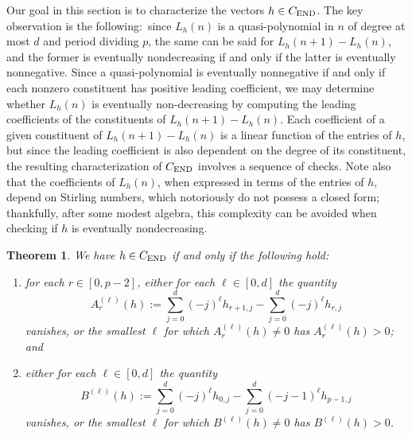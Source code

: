 \documentclass[12pt]{amsart}
\newtheorem{thm}{Theorem}[section]
\theoremstyle{definition}
\numberwithin{equation}{section}
\renewcommand\>{\rangle}
\newcommand\<{\langle}
\newcommand\0{\mathbf{0}}
\begin{document}
Our goal in this section is to characterize the vectors $h \in C_\textnormal{END}$.
The key observation is the following:\ since $L_h(n)$ is a quasi-polynomial in $n$ of degree at most $d$ and period dividing $p$, the same can be said for $L_h(n+1) - L_h(n)$, and the former is eventually nondecreasing if and only if the latter is eventually nonnegative.  Since a quasi-polynomial is eventually nonnegative if and only if each nonzero constituent has positive leading coefficient, we may determine whether $L_h(n)$ is eventually non-decreasing by computing the leading coefficients of the constituents of $L_h(n+1) - L_h(n)$.  Each coefficient of a given constituent of $L_h(n+1) - L_h(n)$ is a linear function of the entries of $h$, but since the leading coefficient is also dependent on the degree of its constituent, the resulting characterization of $C_\textnormal{END}$ involves a sequence of checks.  Note also that the coefficients of $L_h(n)$, when expressed in terms of the entries of $h$, depend on Stirling numbers, which notoriously do not possess a closed form; thankfully, after some modest algebra, this complexity can be avoided when checking if $h$ is eventually nondecreasing.


\begin{thm}\label{t:endh}
We have $h \in C_\textnormal{END}$ if and only if the following hold:
\begin{enumerate}[1.]
\item 
for each $r \in [0, p-2]$, either for each $\ell \in [0, d]$ the quantity
$$
A^{(\ell)}_r(h) := \sum_{j=0}^d (-j)^\ell h_{r+1,j} - \sum_{j=0}^d (-j)^\ell h_{r,j}
$$
vanishes, or the smallest $\ell$ for which $A^{(\ell)}_r(h) \ne 0$ has $A^{(\ell)}_r(h) > 0$; and
\item 
either for each  $\ell \in [0,d]$ the quantity
$$
B^{(\ell)}(h) := \sum_{j=0}^d (-j)^\ell h_{0,j}
- \sum_{j=0}^d (-j-1)^\ell h_{p-1,j}
$$
vanishes, or the smallest $\ell$ for which $B^{(\ell)}(h) \ne 0$ has $B^{(\ell)}(h) > 0$.  
\end{enumerate}
\end{thm}
\end{document}
